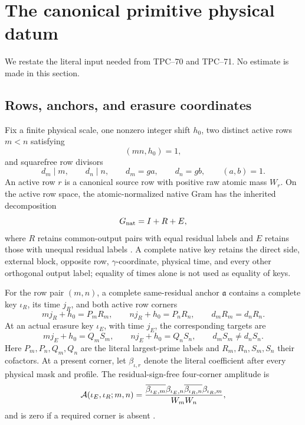 \section{The canonical primitive physical datum}
\label{sec:physical-support}

We restate the literal input needed from TPC--70 and TPC--71.  No estimate
is made in this section.

\subsection{Rows, anchors, and erasure coordinates}

Fix a finite physical scale, one nonzero integer shift \(h_0\), two
distinct active rows \(m<n\) satisfying
\[
 (mn,h_0)=1,
\]
and squarefree row divisors
\[
 d_m\mid m,\qquad d_n\mid n,\qquad
 d_m=ga,\qquad d_n=gb,\qquad(a,b)=1.
\]
An active row \(r\) is a canonical source row with positive raw atomic
mass \(W_r\).  On the active row space, the atomic-normalized native Gram
has the inherited decomposition
\[
 G_{\rm nat}=I+R+E,
\]
where \(R\) retains common-output pairs with equal residual labels and
\(E\) retains those with unequal residual labels
\citep{WangTPC68}.  A complete native key retains the direct side,
external block, opposite row, \(\gamma\)-coordinate, physical time, and
every other orthogonal output label; equality of times alone is not used
as equality of keys.

For the row pair \((m,n)\), a complete same-residual anchor
\(\mathfrak a\) contains a complete key \(\iota_R\), its time \(j_R\), and
both active row corners
\[
 mj_R+h_0=P_mR_m,\qquad
 nj_R+h_0=P_nR_n,\qquad
 d_mR_m=d_nR_n.
\]
At an actual erasure key \(\iota_E\), with time \(j_E\), the corresponding
targets are
\[
 mj_E+h_0=Q_mS_m,\qquad
 nj_E+h_0=Q_nS_n,\qquad
 d_mS_m\ne d_nS_n.
\]
Here \(P_m,P_n,Q_m,Q_n\) are the literal largest-prime labels and
\(R_m,R_n,S_m,S_n\) their cofactors.  At a present corner, let
\(\beta_{\iota,r}\) denote the literal coefficient after every physical
mask and profile.  The residual-sign-free four-corner amplitude is
\begin{equation}
 \mathcal A(\iota_E,\iota_R;m,n)
 =
 \frac{
 \overline{\beta_{\iota_E,m}}\beta_{\iota_E,n}
 \overline{\beta_{\iota_R,n}}\beta_{\iota_R,m}
 }{W_mW_n},
 \label{eq:literal-four-corner-amplitude}
\end{equation}
and is zero if a required corner is absent
\citep{WangTPC70}.

